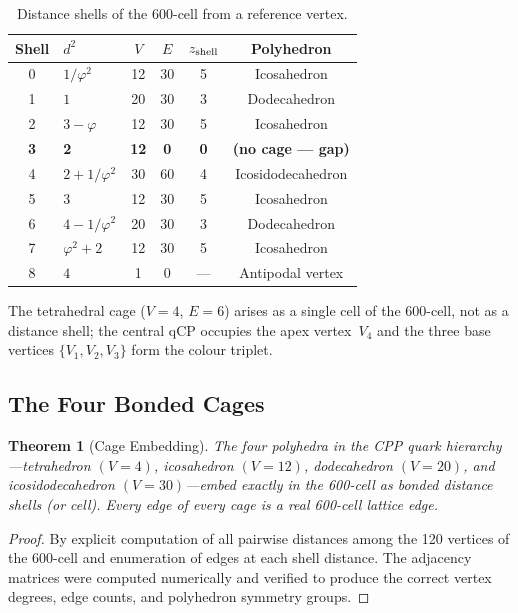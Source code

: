 \documentclass[11pt,letterpaper]{article}
\newtheorem{theorem}{Theorem}[section]
\newcommand{\phig}{\varphi}
\begin{document}
\begin{table}[H]
\centering
\caption{Distance shells of the 600-cell from a reference vertex.}
\label{tab:shells}
\begin{tabular}{clcccc}
\toprule
Shell & $d^2$ & $V$ & $E$ & $z_{\rm shell}$ & Polyhedron \\
\midrule
0 & $1/\phig^2$    & 12 & 30 & 5 & Icosahedron \\
1 & $1$            & 20 & 30 & 3 & Dodecahedron \\
2 & $3-\phig$      & 12 & 30 & 5 & Icosahedron \\
\textbf{3} & \textbf{2} & \textbf{12} & \textbf{0} & \textbf{0}
  & \textbf{(no cage --- gap)} \\
4 & $2+1/\phig^2$  & 30 & 60 & 4 & Icosidodecahedron \\
5 & $3$            & 12 & 30 & 5 & Icosahedron \\
6 & $4-1/\phig^2$  & 20 & 30 & 3 & Dodecahedron \\
7 & $\phig^2+2$    & 12 & 30 & 5 & Icosahedron \\
8 & $4$            & 1  & 0  & --- & Antipodal vertex \\
\bottomrule
\end{tabular}
\end{table}

The tetrahedral cage ($V\!=\!4$, $E\!=\!6$) arises as a single
cell of the 600-cell, not as a distance shell; the central qCP
occupies the apex vertex~$V_4$ and the three base vertices
$\{V_1, V_2, V_3\}$ form the colour triplet.

\subsection{The Four Bonded Cages}

\begin{theorem}[Cage Embedding]
\label{thm:embedding}
The four polyhedra in the CPP quark hierarchy---tetrahedron
$(V\!=\!4)$, icosahedron $(V\!=\!12)$, dodecahedron $(V\!=\!20)$,
and icosidodecahedron $(V\!=\!30)$---embed exactly in the 600-cell
as bonded distance shells (or cell).  Every edge of every cage is
a real 600-cell lattice edge.
\end{theorem}

\begin{proof}
By explicit computation of all pairwise distances among the 120
vertices of the 600-cell and enumeration of edges at each shell
distance.  The adjacency matrices were computed numerically and
verified to produce the correct vertex degrees, edge counts, and
polyhedron symmetry groups.
\end{proof}
\end{document}
